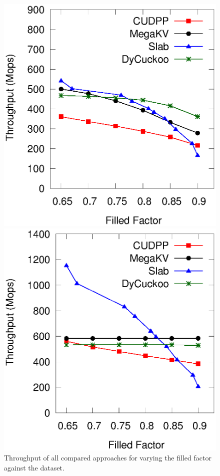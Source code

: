 %
\begin{figure}[t]
	\begin{minipage}{0.48\linewidth}\centering
		\includegraphics[width=\linewidth]{pic/static-load_factor/insert.eps}
		\centerline{}
	\end{minipage}
	\hfill
	\begin{minipage}{0.48\linewidth}\centering
		\includegraphics[width=\linewidth]{pic/static-load_factor/search.eps}
		\centerline{}
	\end{minipage}
	\caption{Throughput of all compared approaches for varying the filled factor against the \dsrandom dataset.}
	\label{fig:static-filled-factor}
\end{figure}

